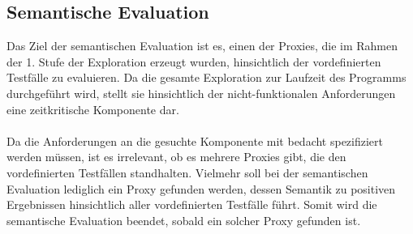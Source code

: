 \documentclass[a4paper,12pt]{article}
\begin{document}
\subsection{Semantische Evaluation}
Das Ziel der semantischen Evaluation ist es, einen der Proxies, die im Rahmen der 1. Stufe der Exploration erzeugt wurden, hinsichtlich der vordefinierten Testfälle zu evaluieren. Da die gesamte Exploration zur Laufzeit des Programms durchgeführt wird, stellt sie hinsichtlich der nicht-funktionalen Anforderungen eine zeitkritische Komponente dar.
\\\\
Da die Anforderungen an die gesuchte Komponente mit bedacht spezifiziert werden müssen, ist es irrelevant, ob es mehrere Proxies gibt, die den vordefinierten Testfällen standhalten. Vielmehr soll bei der semantischen Evaluation lediglich ein Proxy gefunden werden, dessen Semantik zu positiven Ergebnissen hinsichtlich aller vordefinierten Testfälle führt. Somit wird die semantische Evaluation beendet, sobald ein solcher Proxy gefunden ist.
\end{document}
